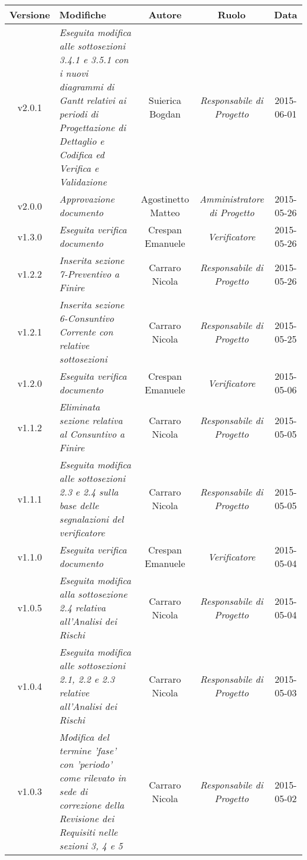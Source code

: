\newpage

\begin{table}[h]
\centering
\begin{tabular}{|c|p{}|c|c|c|}
	\toprule
		\textbf{Versione} & \textbf{Modifiche} & \textbf{Autore} & \textbf{Ruolo} & \textbf{Data}\\
	\midrule
	\midrule
		v2.0.1 & \textit{Eseguita modifica alle sottosezioni 3.4.1 e 3.5.1 con i nuovi diagrammi di Gantt relativi ai periodi di Progettazione di Dettaglio e Codifica ed Verifica e Validazione} & Suierica Bogdan & \textit{Responsabile di Progetto} & 2015-06-01\\
	\midrule
		v2.0.0 & \textit{Approvazione documento} & Agostinetto Matteo & \textit{Amministratore di Progetto} & 2015-05-26\\
	\midrule
		v1.3.0 & \textit{Eseguita verifica documento} & Crespan Emanuele & \textit{Verificatore} & 2015-05-26\\
	\midrule
		v1.2.2 & \textit{Inserita sezione 7-Preventivo a Finire} & Carraro Nicola & \textit{Responsabile di Progetto} & 2015-05-26\\
	\midrule
		v1.2.1 & \textit{Inserita sezione 6-Consuntivo Corrente con relative sottosezioni} & Carraro Nicola & \textit{Responsabile di Progetto} & 2015-05-25\\
	\midrule
		v1.2.0 & \textit{Eseguita verifica documento} & Crespan Emanuele & \textit{Verificatore} & 2015-05-06\\
	\midrule
		v1.1.2 & \textit{Eliminata sezione relativa al Consuntivo a Finire} & Carraro Nicola & \textit{Responsabile di Progetto} & 2015-05-05\\
	\midrule
		v1.1.1 & \textit{Eseguita modifica alle sottosezioni 2.3 e 2.4 sulla base delle segnalazioni del verificatore} & Carraro Nicola & \textit{Responsabile di Progetto} & 2015-05-05\\
	\midrule
		v1.1.0 & \textit{Eseguita verifica documento} & Crespan Emanuele & \textit{Verificatore} & 2015-05-04\\
	\midrule
		v1.0.5 & \textit{Eseguita modifica alla sottosezione 2.4 relativa all'Analisi dei Rischi} & Carraro Nicola & \textit{Responsabile di Progetto} & 2015-05-04\\
	\midrule
		v1.0.4 & \textit{Eseguita modifica alle sottosezioni 2.1, 2.2 e 2.3 relative all'Analisi dei Rischi} & Carraro Nicola & \textit{Responsabile di Progetto} & 2015-05-03\\
	\midrule
		v1.0.3 & \textit{Modifica del termine 'fase' con 'periodo' come rilevato in sede di correzione della Revisione dei Requisiti nelle sezioni 3, 4 e 5} & Carraro Nicola & \textit{Responsabile di Progetto} & 2015-05-02\\
	\bottomrule
\end{tabular}
\end{table}

